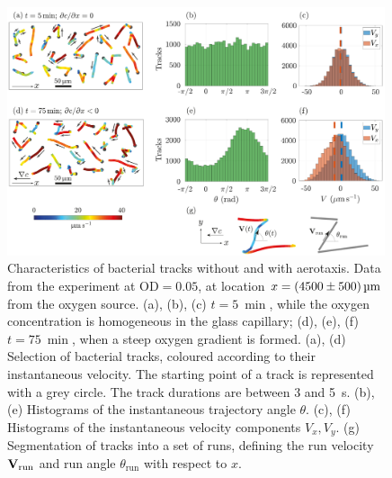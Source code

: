 \documentclass[aps,a4paper,twocolumn,10pt,pre,showpacs]{revtex4-2}
\begin{document}

\begin{figure}
\includegraphics[trim = 0mm 0mm 0mm 0mm, clip, width=0.99\textwidth, angle=0]{Fig02.pdf} 
\caption{Characteristics of bacterial tracks without and with aerotaxis. Data from the experiment at $\mathrm{OD}=0.05$, at location $x=\SI{4500\pm500}{\um}$ from the oxygen source. (a), (b), (c) $t=\SI{5}{\min}$, while the oxygen concentration is homogeneous in the glass capillary; (d), (e), (f) $t=\SI{75}{\min}$, when a steep oxygen gradient is formed. (a), (d) Selection of bacterial tracks, coloured according to their instantaneous velocity. The starting point of a track is represented with a grey circle. The track durations are between 3 and \SI{5}{\s}. (b), (e) Histograms of the instantaneous trajectory angle $\theta$. (c), (f) Histograms of the instantaneous velocity components $V_x,V_y$. (g) Segmentation of tracks into a set of runs, defining the run velocity ${\bf V}_\mathrm{run}$ and run angle $\theta_\mathrm{run}$ with respect to $x$.}
\label{fig:tracks}
\end{figure}
\end{document}

